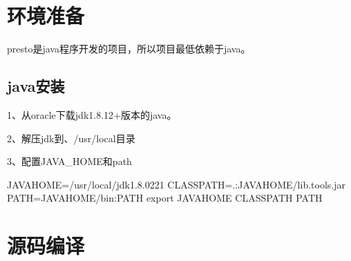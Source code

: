 \documentclass[letterpaper,10pt,english]{sphinxmanual}
\begin{document}
\section{环境准备}
\label{\detokenize{installation/enviroment:id1}}\label{\detokenize{installation/enviroment::doc}}
presto是java程序开发的项目，所以项目最低依赖于java。


\subsection{java安装}
\label{\detokenize{installation/enviroment:java}}
1、从oracle下载jdk1.8.12+版本的java。

\begin{sphinxVerbatim}[commandchars=\\\{\}]
 
\end{sphinxVerbatim}

2、解压jdk到、/usr/local目录

\begin{sphinxVerbatim}[commandchars=\\\{\}]
    
\end{sphinxVerbatim}

3、配置JAVA\_HOME和path

\begin{sphinxVerbatim}[commandchars=\\\{\}]
JAVA\PYGZus{}HOME=/usr/local/jdk1.8.0\PYGZus{}221
CLASSPATH=.:\PYGZdl{}JAVA\PYGZus{}HOME/lib.tools.jar
PATH=\PYGZdl{}JAVA\PYGZus{}HOME/bin:\PYGZdl{}PATH
export JAVA\PYGZus{}HOME CLASSPATH PATH
\end{sphinxVerbatim}


\section{源码编译}
\label{\detokenize{installation/compile:id1}}\label{\detokenize{installation/compile::doc}}
\end{document}

